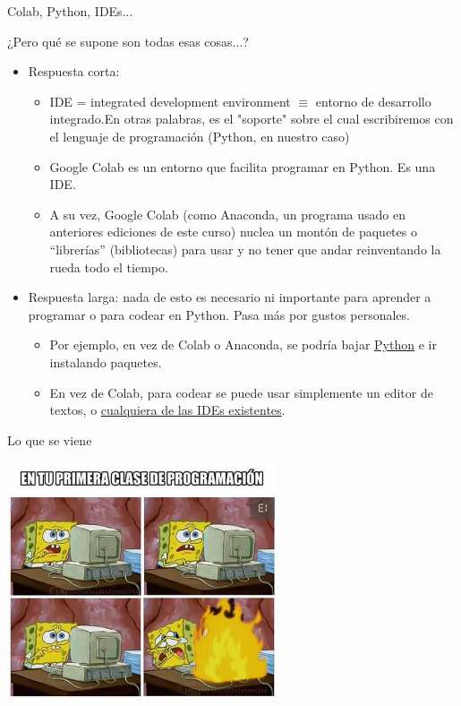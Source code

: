 \documentclass{beamer}
\begin{document}
\begin{frame}{Colab, Python, IDEs...}
\begin{block}{¿Pero qué se supone son todas esas cosas...?}\pause
\begin{itemize}
	\item Respuesta corta:\pause
		\begin{itemize}
			\item IDE = integrated development environment $\equiv$ entorno de desarrollo integrado.\pause En otras palabras, es el "soporte" sobre el cual escribiremos con el lenguaje de programación (Python, en nuestro caso) \pause
			\item Google Colab es un entorno que facilita programar en Python. Es una IDE.\pause			
			\item A su vez, Google Colab (como Anaconda, un programa usado en anteriores ediciones de este curso) nuclea un montón de paquetes o ``librerías'' (bibliotecas) para usar y no tener que andar reinventando la rueda todo el tiempo.\pause
			


		\end{itemize}
	\item Respuesta larga: nada de esto es necesario ni importante para aprender a programar o para codear en Python. Pasa más por gustos personales.\pause
	\begin{itemize}
		\item Por ejemplo, en vez de Colab o Anaconda, se podría bajar \textcolor{blue}{\href{https://www.python.org/}{Python}} e ir instalando paquetes.\pause		
		\item En vez de Colab, para codear se puede usar simplemente un editor de textos, o \textcolor{blue}{\href{https://wiki.python.org/moin/IntegratedDevelopmentEnvironments}{cualquiera de las IDEs existentes}}.
	\end{itemize}
\end{itemize}
\end{block}
\end{frame}

\begin{frame}{Lo que se viene}
\pause
\begin{center}
\includegraphics[height=7cm, scale=0.5]{recursos/meme_explosion.png}
\end{center}
\end{frame}
\end{document}
